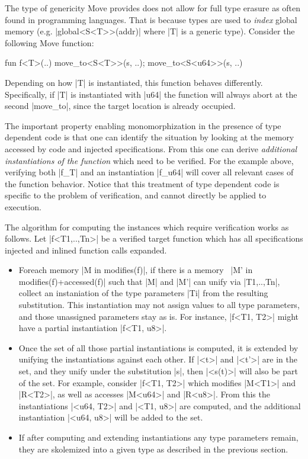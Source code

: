 
The type of genericity Move provides does not allow for full type erasure as
often found in programming languages. That is because types are used to
\emph{index} global memory (e.g. |global<S<T>>(addr)| where |T| is a generic
type). Consider the following Move function:

\begin{Move}
  fun f<T>(..) { move_to<S<T>>(s, ..); move_to<S<u64>>(s, ..) }
\end{Move}

\noindent Depending on how |T| is instantiated, this function behaves
differently.  Specifically, if |T| is instantiated with |u64| the function will
always abort at the second |move_to|, since the target location is already
occupied.

The important property enabling monomorphization in the presence of type
dependent code is that one can identify the situation by looking at the memory
accessed by code and injected specifications. From this one can derive
\emph{additional instantiations of the function} which need to be verified. For
the example above, verifying both |f_T| and an instantiation |f_u64| will cover
all relevant cases of the function behavior. Notice that this treatment of type
dependent code is specific to the problem of verification, and cannot directly
be applied to execution.

The algorithm for computing the instances which require verification works as
follows. Let |f<T1,..,Tn>| be a verified target function which has all
specifications injected and inlined function calls expanded.
\begin{itemize}
\item Foreach memory |M in modifies(f)|, if there is a memory~%
  |M' in modifies(f)+accessed(f)| such that |M| and |M'| can unify via |T1,..,Tn|,
  collect an instaniation of the type parameters |Ti| from the resulting
  substitution. This instantiation may not assign values to all type parameters,
  and those unassigned parameters stay as is. For instance, |f<T1, T2>| might
  have a partial instantiation |f<T1, u8>|.
\item Once the set of all those partial instantiations is computed, it is
  extended by unifying the instantiations against each other. If |<t>| and
  |<t'>| are in the set, and they unify under the substitution |s|, then
  |<s(t)>| will also be part of the set.  For example, consider |f<T1, T2>|
  which modifies |M<T1>| and |R<T2>|, as well as accesses |M<u64>| and
  |R<u8>|. From this the instantiations |<u64, T2>| and |<T1, u8>| are computed,
  and the additional instantiation |<u64, u8>| will be added to the set.
\item If after computing and extending instantiations any type parameters
  remain, they are skolemized into a given type as described in the previous
  section.
\end{itemize}

